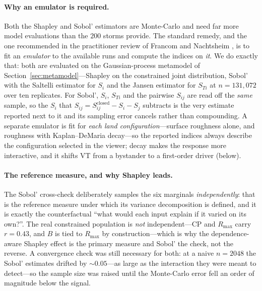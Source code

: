 \documentclass[11pt]{article}
\begin{document}
\paragraph{Why an emulator is required.} Both the Shapley and Sobol' estimators are
Monte-Carlo and need far more model evaluations than the $200$ storms provide. The
standard remedy, and the one recommended in the practitioner review of Francom and
Nachtsheim \cite{francom}, is to fit an \emph{emulator} to the available runs and
compute the indices on \emph{it}. We do exactly that: both are evaluated on the
Gaussian-process metamodel of Section~\ref{sec:metamodel}---Shapley on the constrained
joint distribution, Sobol' with the Saltelli \cite{saltelli2010} estimator for $S_i$
and the Jansen \cite{jansen1999} estimator for $S_{Ti}$ at $n=131{,}072$ over ten
replicates. For Sobol', $S_i$, $S_{Ti}$ and the pairwise $S_{ij}$ are read off the
\emph{same} sample, so the $S_i$ that $S_{ij}=S^{\text{closed}}_{ij}-S_i-S_j$
subtracts is the very estimate reported next to it and its sampling error cancels
rather than compounding. A separate emulator is fit for \emph{each land
configuration}---surface roughness alone, and roughness with Kaplan--DeMaria
decay---so the reported indices always describe the configuration selected in the
viewer; decay makes the response more interactive, and it shifts VT from a bystander
to a first-order driver (below).

\paragraph{The reference measure, and why Shapley leads.} The Sobol' cross-check
deliberately samples the six marginals \emph{independently}: that is the reference
measure under which its variance decomposition is defined, and it is exactly the
counterfactual ``what would each input explain if it varied on its own?''. The real
constrained population is \emph{not} independent---CP and $R_{\max}$ carry $r=0.43$,
and $B$ is tied to $R_{\max}$ by construction---which is why the dependence-aware
Shapley effect is the primary measure and Sobol' the check, not the reverse. A
convergence check was still necessary for both: at a naive $n=2048$ the Sobol'
estimates drifted by $\sim$$0.05$---as large as the interaction they were meant to
detect---so the sample size was raised until the Monte-Carlo error fell an order of
magnitude below the signal.
\end{document}
